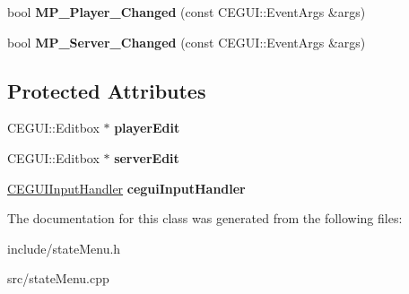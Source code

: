 \begin{DoxyCompactItemize}
\item 
\hypertarget{classMenu_ae13591d3bb560efbf637157c0e33c006}{
bool {\bfseries \-M\-P\-\_\-\-Player\-\_\-\-Changed} (const \-C\-E\-G\-U\-I\-::\-Event\-Args \&args)}
\label{d8/ddb/classMenu_ae13591d3bb560efbf637157c0e33c006}

\item 
\hypertarget{classMenu_aad5b12b52872acef1dcb6b48ebce3b50}{
bool {\bfseries \-M\-P\-\_\-\-Server\-\_\-\-Changed} (const \-C\-E\-G\-U\-I\-::\-Event\-Args \&args)}
\label{d8/ddb/classMenu_aad5b12b52872acef1dcb6b48ebce3b50}

\end{DoxyCompactItemize}
\subsection*{\-Protected \-Attributes}
\begin{DoxyCompactItemize}
\item 
\hypertarget{classMenu_a19b354c1ffc2b0b946e0637d43b0ad73}{
\-C\-E\-G\-U\-I\-::\-Editbox $\ast$ {\bfseries player\-Edit}}
\label{d8/ddb/classMenu_a19b354c1ffc2b0b946e0637d43b0ad73}

\item 
\hypertarget{classMenu_ad28dc1573330acbaf8b39ec8f2df7bff}{
\-C\-E\-G\-U\-I\-::\-Editbox $\ast$ {\bfseries server\-Edit}}
\label{d8/ddb/classMenu_ad28dc1573330acbaf8b39ec8f2df7bff}

\item 
\hypertarget{classMenu_ab3f7fda15d512f5b3f6694afeac57c81}{
\hyperlink{classCEGUIInputHandler}{\-C\-E\-G\-U\-I\-Input\-Handler} {\bfseries cegui\-Input\-Handler}}
\label{d8/ddb/classMenu_ab3f7fda15d512f5b3f6694afeac57c81}

\end{DoxyCompactItemize}


\-The documentation for this class was generated from the following files\-:\begin{DoxyCompactItemize}
\item 
include/state\-Menu.\-h\item 
src/state\-Menu.\-cpp\end{DoxyCompactItemize}
